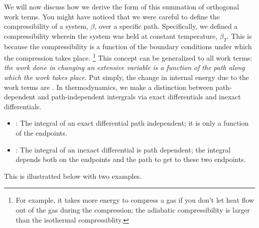\documentclass[12pt]{article}
\begin{document}
We will now discuss how we derive the form of this summation of orthogonal work terms. You might have noticed that we were careful to define the compressibility of a system, $\beta$, over a specific path. Specifically, we defined a compressibility wherein the system was held at constant temperature, $\beta_T$. This is because the compressibility is a function of the boundary conditions under which the compression takes place. \footnote{For example, it takes more energy to compress a gas if you don't let heat flow out of the gas during the compression; the adiabatic compressibility is larger than the isothermal compressiblity.} This concept can be generalized to all work terms: \emph{the work done in changing an extensive variable is a function of the path along which the work takes place}. Put simply, the change in internal energy due to the work terms are . In thermodynamics, we make a distinction between path-dependent and path-independent intergrals via exact differentials and inexact differentials. 
\begin{itemize}
\item {}: The integral of an exact differential path independent; it is only a function of the endpoints.
\item {}: The integral of an inexact differential is path dependent; the integral depends both on the endpoints and the path to get to these two endpoints.
\end{itemize}
This is illustratted below with two examples.
\end{document}

